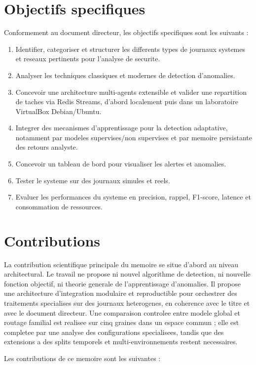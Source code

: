 \section{Objectifs specifiques}
Conformement au document directeur, les objectifs specifiques sont les suivants :

\begin{enumerate}
  \item Identifier, categoriser et structurer les differents types de journaux systemes et reseaux pertinents pour l'analyse de securite.
  \item Analyser les techniques classiques et modernes de detection d'anomalies.
  \item Concevoir une architecture multi-agents extensible et valider une repartition de taches via Redis Streams, d'abord localement puis dans un laboratoire VirtualBox Debian/Ubuntu.
  \item Integrer des mecanismes d'apprentissage pour la detection adaptative, notamment par modeles supervises/non supervises et par memoire persistante des retours analyste.
  \item Concevoir un tableau de bord pour visualiser les alertes et anomalies.
  \item Tester le systeme sur des journaux simules et reels.
  \item Evaluer les performances du systeme en precision, rappel, F1-score, latence et consommation de ressources.
\end{enumerate}

\section{Contributions}
La contribution scientifique principale du memoire se situe d'abord au niveau architectural. Le travail ne propose ni nouvel algorithme de detection, ni nouvelle fonction objectif, ni theorie generale de l'apprentissage d'anomalies. Il propose une architecture d'integration modulaire et reproductible pour orchestrer des traitements specialises sur des journaux heterogenes, en coherence avec le titre et avec le document directeur. Une comparaison controlee entre modele global et routage familial est realisee sur cinq graines dans un espace commun ; elle est completee par une analyse des configurations specialisees, tandis que des extensions a des splits temporels et multi-environnements restent necessaires.

Les contributions de ce memoire sont les suivantes :

